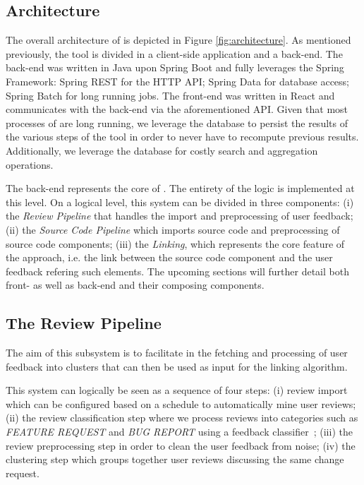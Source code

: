 \subsection{\tool{} Architecture}
The overall architecture of \tool{} is depicted in Figure \ref{fig:architecture}.
As mentioned previously, the tool is divided in a client-side application and a back-end.
The back-end was written in Java upon Spring Boot and fully leverages the Spring Framework: Spring REST for the HTTP API; Spring Data for database access; Spring Batch for long running jobs. 
The front-end was written in React and communicates with the back-end via the aforementioned API.
Given that most processes of \tool{} are long running, we leverage the database to persist the results of the various steps of the tool in order to never have to recompute previous results. Additionally, we leverage the database for costly search and aggregation operations.

The back-end represents the core of \tool{}. The entirety of the logic is implemented at this level. On a logical level, this system can be divided in three components: (i) the \textit{Review Pipeline} that handles the import and preprocessing of user feedback; (ii) the \textit{Source Code Pipeline} which imports source code and preprocessing of source code components; (iii) the \textit{Linking}, which represents the core feature of the \tool{} approach, i.e. the link between the source code component and the user feedback refering such elements. The upcoming sections will further detail both front- as well as back-end and their composing components.

%
%
\subsection{The Review Pipeline}

The aim of this subsystem is to facilitate in the fetching and processing of user feedback into clusters that can then be used as input for the linking algorithm.

This system can logically be seen as a sequence of four steps: (i) review import which can be configured based on a schedule to automatically mine user reviews; (ii) the review classification step where we process reviews into categories such as \textit{FEATURE REQUEST} and \textit{BUG REPORT} using a feedback classifier~\cite{panichella2016ardoc}; (iii) the review preprocessing step in order to clean the user feedback from noise; (iv) the clustering step which groups together user reviews discussing the same change request.

